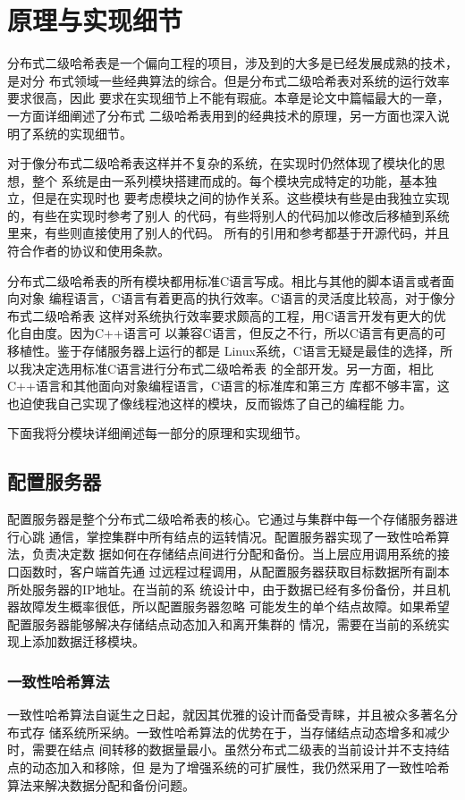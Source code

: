 \chapter{原理与实现细节}\label{chapter:implementation}
分布式二级哈希表是一个偏向工程的项目，涉及到的大多是已经发展成熟的技术，是对分
布式领域一些经典算法的综合。但是分布式二级哈希表对系统的运行效率要求很高，因此
要求在实现细节上不能有瑕疵。本章是论文中篇幅最大的一章，一方面详细阐述了分布式
二级哈希表用到的经典技术的原理，另一方面也深入说明了系统的实现细节。

对于像分布式二级哈希表这样并不复杂的系统，在实现时仍然体现了模块化的思想，整个
系统是由一系列模块搭建而成的。每个模块完成特定的功能，基本独立，但是在实现时也
要考虑模块之间的协作关系。这些模块有些是由我独立实现的，有些在实现时参考了别人
的代码，有些将别人的代码加以修改后移植到系统里来，有些则直接使用了别人的代码。
所有的引用和参考都基于开源代码，并且符合作者的协议和使用条款。

分布式二级哈希表的所有模块都用标准C语言写成。相比与其他的脚本语言或者面向对象
编程语言，C语言有着更高的执行效率。C语言的灵活度比较高，对于像分布式二级哈希表
这样对系统执行效率要求颇高的工程，用C语言开发有更大的优化自由度。因为C++语言可
以兼容C语言，但反之不行，所以C语言有更高的可移植性。鉴于存储服务器上运行的都是
Linux系统，C语言无疑是最佳的选择，所以我决定选用标准C语言进行分布式二级哈希表
的全部开发。另一方面，相比C++语言和其他面向对象编程语言，C语言的标准库和第三方
库都不够丰富，这也迫使我自己实现了像线程池这样的模块，反而锻炼了自己的编程能
力。

下面我将分模块详细阐述每一部分的原理和实现细节。

\section{配置服务器}
配置服务器是整个分布式二级哈希表的核心。它通过与集群中每一个存储服务器进行心跳
通信，掌控集群中所有结点的运转情况。配置服务器实现了一致性哈希算法，负责决定数
据如何在存储结点间进行分配和备份。当上层应用调用系统的接口函数时，客户端首先通
过远程过程调用，从配置服务器获取目标数据所有副本所处服务器的IP地址。在当前的系
统设计中，由于数据已经有多份备份，并且机器故障发生概率很低，所以配置服务器忽略
可能发生的单个结点故障。如果希望配置服务器能够解决存储结点动态加入和离开集群的
情况，需要在当前的系统实现上添加数据迁移模块。

\subsection{一致性哈希算法}\label{subsection:consistent}
一致性哈希算法自诞生之日起，就因其优雅的设计而备受青睐，并且被众多著名分布式存
储系统所采纳。一致性哈希算法的优势在于，当存储结点动态增多和减少时，需要在结点
间转移的数据量最小。虽然分布式二级表的当前设计并不支持结点的动态加入和移除，但
是为了增强系统的可扩展性，我仍然采用了一致性哈希算法来解决数据分配和备份问题。

